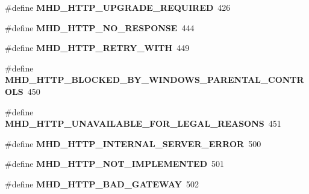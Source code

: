 \begin{DoxyCompactItemize}
\item 
\hypertarget{group__httpcode_gab199b66425fa876653d76b99a373e34d}{\#define {\bfseries \-M\-H\-D\-\_\-\-H\-T\-T\-P\-\_\-\-U\-P\-G\-R\-A\-D\-E\-\_\-\-R\-E\-Q\-U\-I\-R\-E\-D}~426}\label{group__httpcode_gab199b66425fa876653d76b99a373e34d}

\item 
\hypertarget{group__httpcode_ga77ee9d9876605f9727aa0299aa120bc3}{\#define {\bfseries \-M\-H\-D\-\_\-\-H\-T\-T\-P\-\_\-\-N\-O\-\_\-\-R\-E\-S\-P\-O\-N\-S\-E}~444}\label{group__httpcode_ga77ee9d9876605f9727aa0299aa120bc3}

\item 
\hypertarget{group__httpcode_ga6cf8cd032c4299b9e6b59eb0d30ee8aa}{\#define {\bfseries \-M\-H\-D\-\_\-\-H\-T\-T\-P\-\_\-\-R\-E\-T\-R\-Y\-\_\-\-W\-I\-T\-H}~449}\label{group__httpcode_ga6cf8cd032c4299b9e6b59eb0d30ee8aa}

\item 
\hypertarget{group__httpcode_gab1aab3f5ac189a3d07e2e4fbc9796266}{\#define {\bfseries \-M\-H\-D\-\_\-\-H\-T\-T\-P\-\_\-\-B\-L\-O\-C\-K\-E\-D\-\_\-\-B\-Y\-\_\-\-W\-I\-N\-D\-O\-W\-S\-\_\-\-P\-A\-R\-E\-N\-T\-A\-L\-\_\-\-C\-O\-N\-T\-R\-O\-L\-S}~450}\label{group__httpcode_gab1aab3f5ac189a3d07e2e4fbc9796266}

\item 
\hypertarget{group__httpcode_gaa63ec8524ae19a9798a85cc4371149be}{\#define {\bfseries \-M\-H\-D\-\_\-\-H\-T\-T\-P\-\_\-\-U\-N\-A\-V\-A\-I\-L\-A\-B\-L\-E\-\_\-\-F\-O\-R\-\_\-\-L\-E\-G\-A\-L\-\_\-\-R\-E\-A\-S\-O\-N\-S}~451}\label{group__httpcode_gaa63ec8524ae19a9798a85cc4371149be}

\item 
\hypertarget{group__httpcode_ga0fe68698845047ad1245f46ceebe0e80}{\#define {\bfseries \-M\-H\-D\-\_\-\-H\-T\-T\-P\-\_\-\-I\-N\-T\-E\-R\-N\-A\-L\-\_\-\-S\-E\-R\-V\-E\-R\-\_\-\-E\-R\-R\-O\-R}~500}\label{group__httpcode_ga0fe68698845047ad1245f46ceebe0e80}

\item 
\hypertarget{group__httpcode_ga4dfc19e5033df14218e3db7f8ac10a52}{\#define {\bfseries \-M\-H\-D\-\_\-\-H\-T\-T\-P\-\_\-\-N\-O\-T\-\_\-\-I\-M\-P\-L\-E\-M\-E\-N\-T\-E\-D}~501}\label{group__httpcode_ga4dfc19e5033df14218e3db7f8ac10a52}

\item 
\hypertarget{group__httpcode_ga54d7d978755851b12f5ccc284ab4efe6}{\#define {\bfseries \-M\-H\-D\-\_\-\-H\-T\-T\-P\-\_\-\-B\-A\-D\-\_\-\-G\-A\-T\-E\-W\-A\-Y}~502}\label{group__httpcode_ga54d7d978755851b12f5ccc284ab4efe6}


\end{DoxyCompactItemize}
